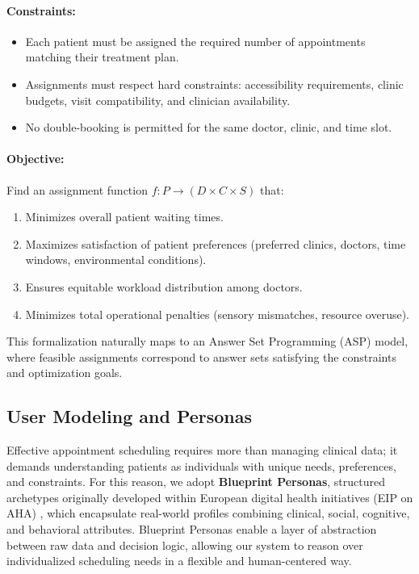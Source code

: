 \documentclass{tlp}
\begin{document}
\paragraph{Constraints:}
\begin{itemize}
    \item Each patient must be assigned the required number of appointments matching their treatment plan.
    \item Assignments must respect hard constraints: accessibility requirements, clinic budgets, visit compatibility, and clinician availability.
    \item No double-booking is permitted for the same doctor, clinic, and time slot.
\end{itemize}

\paragraph{Objective:}
Find an assignment function $f : P \to (D \times C \times S)$ that:
\begin{enumerate}
    \item Minimizes overall patient waiting times.
    \item Maximizes satisfaction of patient preferences (preferred clinics, doctors, time windows, environmental conditions).
    \item Ensures equitable workload distribution among doctors.
    \item Minimizes total operational penalties (sensory mismatches, resource overuse).
\end{enumerate}

This formalization naturally maps to an Answer Set Programming (ASP) model, where feasible assignments correspond to answer sets satisfying the constraints and optimization goals.


\subsection{User Modeling and Personas}
Effective appointment scheduling requires more than managing clinical data; it demands understanding patients as individuals with unique needs, preferences, and constraints. For this reason, we adopt \textbf{Blueprint Personas}, structured archetypes originally developed within European digital health initiatives (EIP on AHA) \citep{EIP_AHA}, which encapsulate real-world profiles combining clinical, social, cognitive, and behavioral attributes. Blueprint Personas enable a layer of abstraction between raw data and decision logic, allowing our system to reason over individualized scheduling needs in a flexible and human-centered way.
\end{document}
